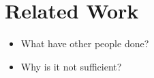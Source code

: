 \documentclass[rnd]{mas_proposal}
\begin{document}
\section{Related Work}
\begin{itemize}
    \item What have other people done?
    \item Why is it not sufficient?
\end{itemize}




\nocite{*}

\end{document}
